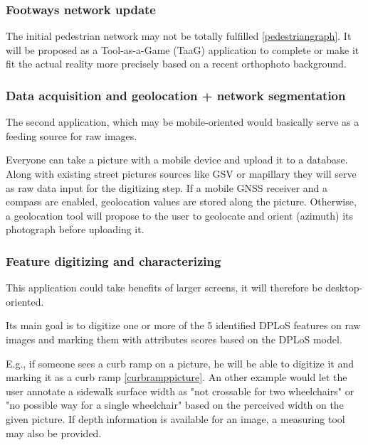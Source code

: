 \documentclass[10pt,conference,a4paper]{IEEEtran}
\begin{document}
\subsubsection*{Footways network update}
The initial pedestrian network may not be totally fulfilled \ref{pedestriangraph}. It will be proposed as a Tool-as-a-Game (TaaG) application to complete or make it fit the actual reality more precisely based on a recent orthophoto background. %


\subsubsection*{Data acquisition and geolocation + network segmentation}
The second application, which may be mobile-oriented would basically serve as a feeding source for raw images. 

Everyone can take a picture with a mobile device and upload it to a database. Along with existing street pictures sources like GSV or mapillary \cite{sweden_street-level_nodate,neuhold2017mapillary} %
they will serve as raw data input for the digitizing step.
If a mobile GNSS receiver and a compass are enabled, geolocation values are stored along the picture. Otherwise, a geolocation tool will propose to the user to geolocate and orient (azimuth) its photograph before uploading it. %



\subsubsection*{Feature digitizing and characterizing}
This application could take benefits of larger screens, it will therefore be desktop-oriented. 

Its main goal is to digitize one or more of the 5 identified DPLoS features on raw images and marking them with attributes scores based on the DPLoS model. 

E.g., if someone sees a curb ramp on a picture, he will be able to digitize it and marking it as a curb ramp \ref{curbramppicture}. An other example would let the user annotate a sidewalk surface width as "not crossable for two wheelchairs" or "no possible way for a single wheelchair" based on the perceived width on the given picture. If depth information is available for an image, a measuring tool may also be provided.
\end{document}
